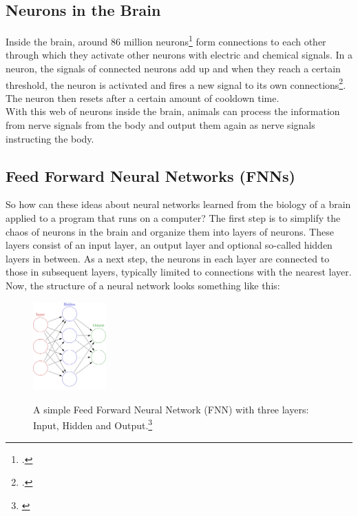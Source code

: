 \documentclass[11pt]{report}
\begin{document}
    \subsection{Neurons in the Brain}\label{subsec:neurons-in-the-brain}
    Inside the brain, around 86 million neurons\footcite{caruso_23} form connections to each other through which they activate other neurons with electric and chemical signals.
    In a neuron, the signals of connected neurons add up and when they reach a certain threshold, the neuron is activated and fires a new signal to its own connections\footcite{Newman_23}.
    The neuron then resets after a certain amount of cooldown time.
    \\
    With this web of neurons inside the brain, animals can process the information from nerve signals from the body and output them again as nerve signals instructing the body.

    \subsection{Feed Forward Neural Networks (FNNs)}\label{subsec:feed-forward-neural-networks-(fnns)}
    So how can these ideas about neural networks learned from the biology of a brain applied to a program that runs on a computer?
    The first step is to simplify the chaos of neurons in the brain and organize them into layers of neurons.
    These layers consist of an input layer, an output layer and optional so-called hidden layers in between.
    As a next step, the neurons in each layer are connected to those in subsequent layers, typically limited to connections with the nearest layer.
    \\
    Now, the structure of a neural network looks something like this:
    \begin{figure}[H]
        \centering
        \includegraphics[width=0.25\textwidth]{nn_simple_1}~\caption{A simple Feed Forward Neural Network (FNN) with three layers: Input, Hidden and Output.\footnote{\cite{nn_simple_img_1}}}
        \label{fig:nn_simple_1}
    \end{figure}
    
\end{document}
